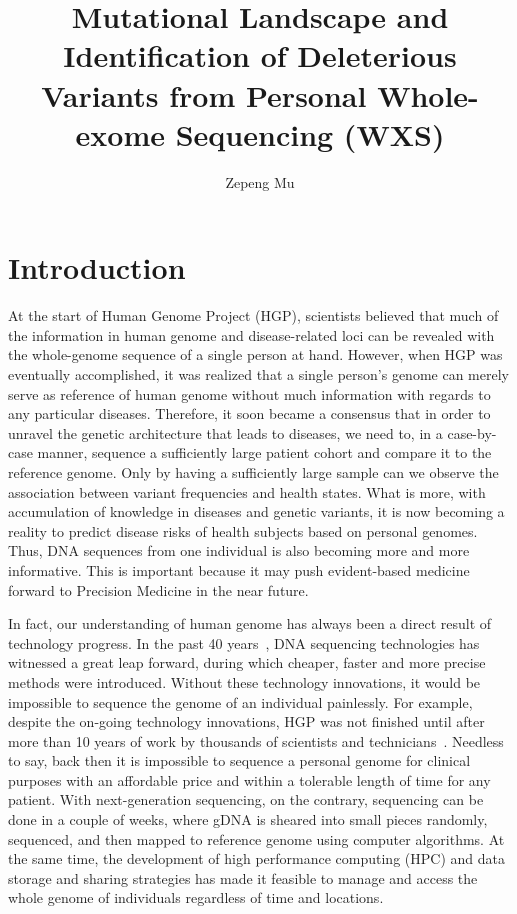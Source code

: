 \documentclass[a4paper, 12pt]{article}
\author{Zepeng Mu}
\title{Mutational Landscape and Identification of Deleterious Variants from Personal Whole-exome Sequencing (WXS)}
\date{}
\begin{document}
	
	\maketitle
	
		
		\section*{Introduction}
		
			At the start of Human Genome Project (HGP), scientists believed that much of the information in human genome and disease-related loci can be revealed with the whole-genome sequence of a single person at hand. However, when HGP was eventually accomplished, it was realized that a single person's genome can merely serve as reference of human genome without much information with regards to any particular diseases. Therefore, it soon became a consensus that in order to unravel the genetic architecture that leads to diseases, we need to, in a case-by-case manner, sequence a sufficiently large patient cohort and compare it to the reference genome. Only by having a sufficiently large sample can we observe the association between variant frequencies and health states. What is more, with accumulation of knowledge in diseases and genetic variants, it is now becoming a reality to predict disease risks of health subjects based on personal genomes. Thus, DNA sequences from one individual is also becoming more and more informative. This is important because it may push evident-based medicine forward to Precision Medicine in the near future.
			
			In fact, our understanding of human genome has always been a direct result of technology progress. In the past 40 years~\parencite{Shendure2017}, DNA sequencing technologies has witnessed a great leap forward, during which cheaper, faster and more precise methods were introduced. Without these technology innovations, it would be impossible to sequence the genome of an individual painlessly. For example, despite the on-going technology innovations, HGP was not finished until after more than 10 years of work by thousands of scientists and technicians~\parencite{InternationalHumanGenomeSequencingConsortium2001}. Needless to say, back then it is impossible to sequence a personal genome for clinical purposes with an affordable price and within a tolerable length of time for any patient. With next-generation sequencing, on the contrary, sequencing can be done in a couple of weeks, where gDNA is sheared into small pieces randomly, sequenced, and then mapped to reference genome using computer algorithms. At the same time, the development of high performance computing (HPC) and data storage and sharing strategies has made it feasible to manage and access the whole genome of individuals regardless of time and locations.
			
\end{document}
